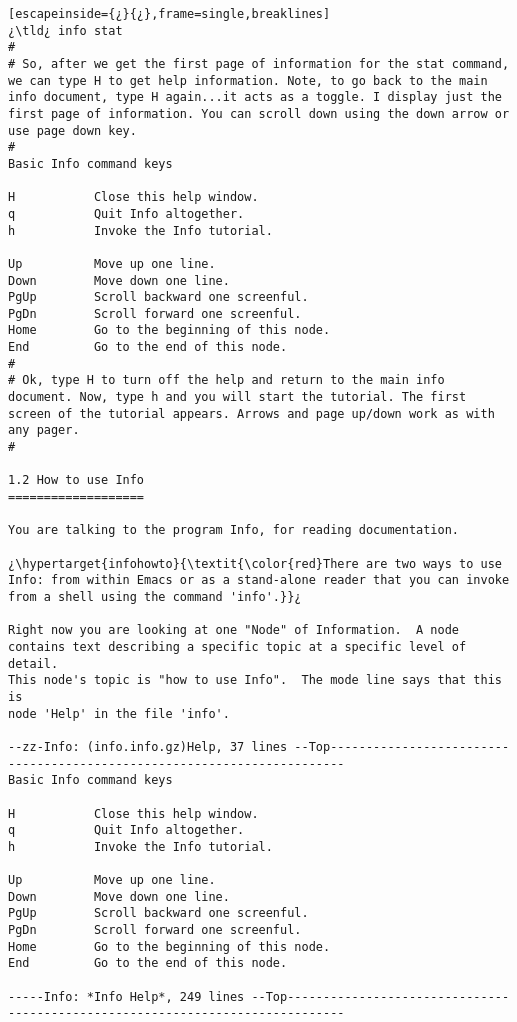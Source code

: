 \begin{lstlisting}[escapeinside={¿}{¿},frame=single,breaklines]
¿\tld¿ info stat
#
# So, after we get the first page of information for the stat command, we can type H to get help information. Note, to go back to the main info document, type H again...it acts as a toggle. I display just the first page of information. You can scroll down using the down arrow or use page down key.
#
Basic Info command keys

H           Close this help window.
q           Quit Info altogether.
h           Invoke the Info tutorial.

Up          Move up one line.
Down        Move down one line.
PgUp        Scroll backward one screenful.
PgDn        Scroll forward one screenful.
Home        Go to the beginning of this node.
End         Go to the end of this node.
#
# Ok, type H to turn off the help and return to the main info document. Now, type h and you will start the tutorial. The first screen of the tutorial appears. Arrows and page up/down work as with any pager.
#

1.2 How to use Info
===================

You are talking to the program Info, for reading documentation.

¿\hypertarget{infohowto}{\textit{\color{red}There are two ways to use Info: from within Emacs or as a stand-alone reader that you can invoke from a shell using the command 'info'.}}¿

Right now you are looking at one "Node" of Information.  A node
contains text describing a specific topic at a specific level of detail.
This node's topic is "how to use Info".  The mode line says that this is
node 'Help' in the file 'info'.

--zz-Info: (info.info.gz)Help, 37 lines --Top------------------------------------------------------------------------
Basic Info command keys

H           Close this help window.
q           Quit Info altogether.
h           Invoke the Info tutorial.

Up          Move up one line.
Down        Move down one line.
PgUp        Scroll backward one screenful.
PgDn        Scroll forward one screenful.
Home        Go to the beginning of this node.
End         Go to the end of this node.

-----Info: *Info Help*, 249 lines --Top------------------------------------------------------------------------------
\end{lstlisting}

